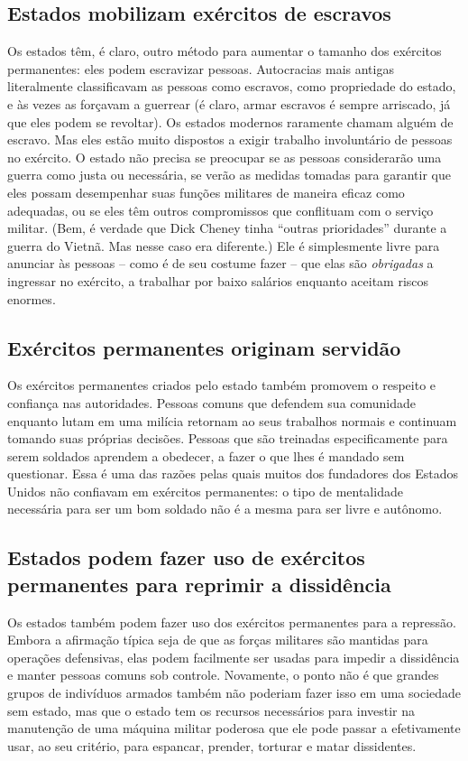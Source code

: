 \subsection*{Estados mobilizam exércitos de escravos}

Os estados têm, é claro, outro método para aumentar o tamanho dos exércitos permanentes: eles podem escravizar pessoas. Autocracias mais antigas literalmente classificavam as pessoas como escravos, como propriedade do estado, e às vezes as forçavam a guerrear (é claro, armar escravos é sempre arriscado, já que eles podem se revoltar). Os estados modernos raramente chamam alguém de escravo. Mas eles estão muito dispostos a exigir trabalho involuntário de pessoas no exército. O estado não precisa se preocupar se as pessoas considerarão uma guerra como justa ou necessária, se verão as medidas tomadas para garantir que eles possam desempenhar suas funções militares de maneira eficaz como adequadas, ou se eles têm outros compromissos que conflituam com o serviço militar. (Bem, é verdade que Dick Cheney tinha ``outras prioridades'' durante a guerra do Vietnã. Mas nesse caso era diferente.) Ele é simplesmente livre para anunciar às pessoas -- como é de seu costume fazer -- que elas são \emph{obrigadas} a ingressar no exército, a trabalhar por baixo salários enquanto aceitam riscos enormes.

\subsection*{Exércitos permanentes originam servidão}

Os exércitos permanentes criados pelo estado também promovem o respeito e confiança nas autoridades. Pessoas comuns que defendem sua comunidade enquanto lutam em uma milícia retornam ao seus trabalhos normais e continuam tomando suas próprias decisões. Pessoas que são treinadas especificamente para serem soldados aprendem a obedecer, a fazer o que lhes é mandado sem questionar. Essa é uma das razões pelas quais muitos dos fundadores dos Estados Unidos não confiavam em exércitos permanentes: o tipo de mentalidade necessária para ser um bom soldado não é a mesma para ser livre e autônomo.

\subsection*{Estados podem fazer uso de exércitos permanentes para reprimir a dissidência}

Os estados também podem fazer uso dos exércitos permanentes para a repressão. Embora a afirmação típica seja de que as forças militares são mantidas para operações defensivas, elas podem facilmente ser usadas para impedir a dissidência e manter pessoas comuns sob controle. Novamente, o ponto não é que grandes grupos de indivíduos armados também não poderiam fazer isso em uma sociedade sem estado, mas que o estado tem os recursos necessários para investir na manutenção de uma máquina militar poderosa que ele pode passar a efetivamente usar, ao seu critério, para espancar, prender, torturar e matar dissidentes.

